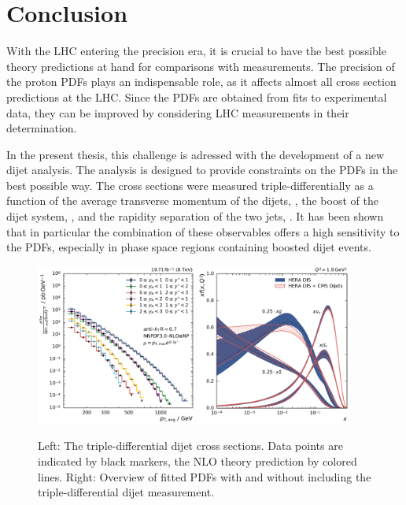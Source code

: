 
\chapter{Conclusion}

With the LHC entering the precision era, it is crucial to have the best possible
theory predictions at hand for comparisons with measurements. The precision of
the proton PDFs plays an indispensable role, as it affects almost all cross section
predictions at the LHC. Since the PDFs are obtained from fits to experimental data,
they can be improved by considering LHC measurements in their
determination.

In the present thesis, this challenge is adressed with the development of a new
dijet analysis. The analysis is designed to provide constraints on the PDFs in
the best possible way. The cross sections were measured triple-differentially as
a function of the average transverse momentum of the dijets, \ptavg, the boost
of the dijet system, \yboost, and the rapidity separation of the two jets,
\ystar.  It has been shown that in particular the combination of these
observables offers a high sensitivity to the PDFs, especially in phase space
regions containing boosted dijet events.


\begin{figure}[h!tbp]
    \centering
    \includegraphics[width=0.47\textwidth]{figures/measurement/ptavg_spectrum.pdf}\hfill
    \includegraphics[width=0.45\textwidth]{figures/pdf_constraints/pdfcomp_direct_overview_1.9.pdf}
    \caption[Summary plot of results]{Left:
    The triple-differential dijet cross sections. Data points are indicated by black
    markers, the NLO theory prediction by colored lines. Right: Overview of
    fitted PDFs with and without including the triple-differential dijet
    measurement.}
    \label{fig:conclusion}
\end{figure}

